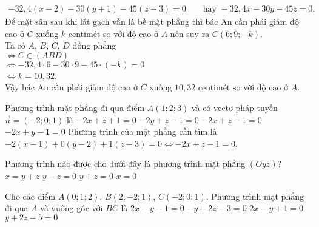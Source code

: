 \begin{vd}
{\begin{eqnarray*}
			-32{,}4 (x-2)-30(y+1)-45(z-3)=0 \qquad \text{hay } -32{,}4 x -30y -45z=0.
		\end{eqnarray*}
		Để mặt sân sau khi lát gạch vẫn là bề mặt phẳng thì bác An cần phải giảm độ cao ở $C$ xuống $k$ centimét so với độ cao ở $A$ nên suy ra $C(6; 9 ; -k)$.\\
		Ta có $A$, $B$, $C$, $D$ đồng phẳng\\
		$\Leftrightarrow C \in (ABD)$\\
		$\Leftrightarrow -32{,}4\cdot 6 -30 \cdot 9 -45\cdot (-k)=0$\\
		$\Leftrightarrow k=10{,}32$.\\
		Vậy bác An cần phải giảm độ cao ở $C$ xuống $10{,}32$ centimét so với độ cao ở $A$.
	}
\end{vd}
\setcounter{ex}{0}
\begin{ex}%
	Phương trình mặt phẳng đi qua điểm $A(1;2;3)$ và có vectơ pháp tuyến $\overrightarrow{n}=(-2;0;1)$ là
	\choice
	{$-2x+z+1=0$}
	{$-2y+z-1=0$}
	{\True $-2x+z-1=0$}
	{$-2x+y-1=0$}
	\loigiai
	{
		Phương trình của mặt phẳng cần tìm là $-2(x-1)+0(y-2)+1(z-3)=0 \Leftrightarrow -2x+z-1=0$.
	}
\end{ex}

\begin{ex}%
	Phương trình nào được cho dưới đây là phương trình mặt phẳng $(Oyz)$?
	\choice
	{$x=y+z$}
	{$y-z=0$}
	{$y+z=0$}
	{\True $x=0$}
\end{ex}

\begin{ex}%
	Cho các điểm $A(0;1;2)$, $B(2;- 2;1)$, $C(- 2;0;1)$. Phương trình mặt phẳng đi qua $A$ và vuông góc với $BC$ là
	\choice
	{$2x - y - 1 = 0$}
	{$ - y + 2z - 3 = 0$}
	{\True $2x - y + 1 = 0$}
	{$y + 2z - 5 = 0$}
\end{ex}

